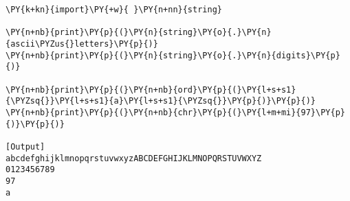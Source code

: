 \begin{Verbatim}[label=\makebox{\href{https://github.com/unipi-physics-labs/statnotes/tree/main/snippy/ascii.py}{https://github.com/.../ascii.py}},commandchars=\\\{\}]
\PY{k+kn}{import}\PY{+w}{ }\PY{n+nn}{string}

\PY{n+nb}{print}\PY{p}{(}\PY{n}{string}\PY{o}{.}\PY{n}{ascii\PYZus{}letters}\PY{p}{)}
\PY{n+nb}{print}\PY{p}{(}\PY{n}{string}\PY{o}{.}\PY{n}{digits}\PY{p}{)}

\PY{n+nb}{print}\PY{p}{(}\PY{n+nb}{ord}\PY{p}{(}\PY{l+s+s1}{\PYZsq{}}\PY{l+s+s1}{a}\PY{l+s+s1}{\PYZsq{}}\PY{p}{)}\PY{p}{)}
\PY{n+nb}{print}\PY{p}{(}\PY{n+nb}{chr}\PY{p}{(}\PY{l+m+mi}{97}\PY{p}{)}\PY{p}{)}

[Output]
abcdefghijklmnopqrstuvwxyzABCDEFGHIJKLMNOPQRSTUVWXYZ
0123456789
97
a
\end{Verbatim}
